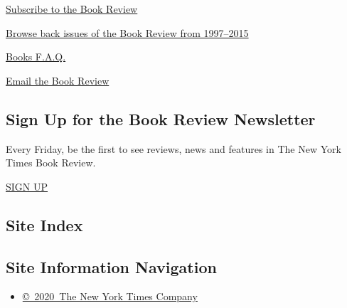 \href{https://homedelivery.nytimes3xbfgragh.onion/HDS/BookReviewHome.do?mode=BookReviewHome\&ref=review}{Subscribe
to the Book Review}

\href{https://www.nytimes3xbfgragh.onion/2014/07/29/books/review/the-new-york-times-book-review-back-issues.html}{Browse
back issues of the Book Review from 1997--2015}

\href{https://www.nytimes3xbfgragh.onion/membercenter/faq/books.html?ref=review}{Books
F.A.Q.}

\href{mailto:books@NYTimes.com}{Email the Book Review}

\hypertarget{sign-up-for-the-book-review-newsletter}{%
\subsection{Sign Up for the Book Review
Newsletter}\label{sign-up-for-the-book-review-newsletter}}

Every Friday, be the first to see reviews, news and features in The New
York Times Book Review.

\href{/newsletters/signup/BK}{SIGN UP}

\hypertarget{site-index}{%
\subsection{Site Index}\label{site-index}}

\hypertarget{site-information-navigation}{%
\subsection{Site Information
Navigation}\label{site-information-navigation}}

\begin{itemize}
\tightlist
\item
  \href{https://help.nytimes3xbfgragh.onion/hc/en-us/articles/115014792127-Copyright-notice}{©~2020~The
  New York Times Company}
\end{itemize}

